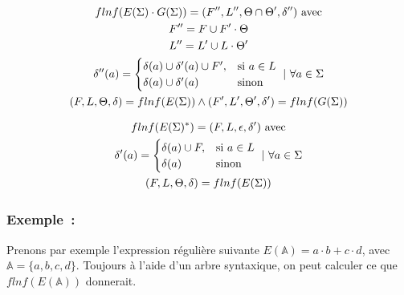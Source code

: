 \documentclass[12pt]{article}
\begin{document}
\begin{gather}
    flnf(E(\Sigma) \cdot G(\Sigma)) = (F'', L'', \Theta \cap \Theta', \delta'')~ \text{avec} \\
    F'' = F \cup F' \cdot \Theta \notag \\
    L'' = L' \cup L \cdot \Theta' \notag \\
    \delta''(a) = \begin{cases} \delta(a) \cup \delta'(a) \cup F', & \text{si}~ a \in L \\ \delta(a) \cup \delta'(a) & \text{sinon}\end{cases} ~|~ \forall a \in \Sigma\notag \\
    (F, L, \Theta, \delta) = flnf(E(\Sigma)) \land (F', L', \Theta', \delta') = flnf(G(\Sigma)) \notag
\end{gather}

\begin{gather}
    flnf(E(\Sigma)^*) = (F, L, \epsilon, \delta')~ \text{avec} \\
    \delta'(a) = \begin{cases} \delta(a) \cup F, & \text{si}~ a \in L \\ \delta(a) & \text{sinon}\end{cases} ~|~ \forall a \in \Sigma\notag \\
    (F, L, \Theta, \delta) = flnf(E(\Sigma)) \notag
\end{gather}

\subsubsection*{Exemple~:}

Prenons par exemple l'expression régulière suivante \(E(\mathbb{A}) = a \cdot b
+ c \cdot d\), avec \(\mathbb{A} = \{a, b, c, d\}\). Toujours à l'aide d'un
arbre syntaxique, on peut calculer ce que \(flnf(E(\mathbb{A}))\) donnerait.
\end{document}
